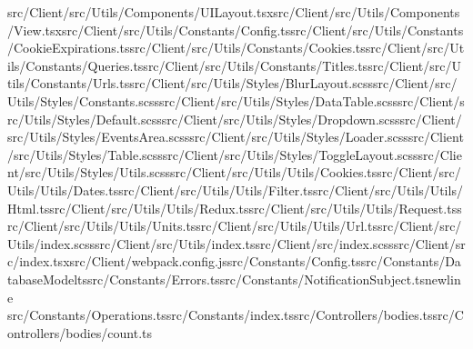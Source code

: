 \documentclass[a4paper,12pt]{article}
\begin{document}
src/Client/src/Utils/Components/UILayout.tsx\newline src/Client/src/Utils/Components/View.tsx\newline src/Client/src/Utils/Constants/Config.ts\newline src/Client/src/Utils/Constants/CookieExpirations.ts\newline src/Client/src/Utils/Constants/Cookies.ts\newline src/Client/src/Utils/Constants/Queries.ts\newline src/Client/src/Utils/Constants/Titles.ts\newline src/Client/src/Utils/Constants/Urls.ts\newline src/Client/src/Utils/Styles/BlurLayout.scss\newline src/Client/src/Utils/Styles/Constants.scss\newline src/Client/src/Utils/Styles/DataTable.scss\newline src/Client/src/Utils/Styles/Default.scss\newline src/Client/src/Utils/Styles/Dropdown.scss\newline src/Client/src/Utils/Styles/EventsArea.scss\newline src/Client/src/Utils/Styles/Loader.scss\newline src/Client/src/Utils/Styles/Table.scss\newline src/Client/src/Utils/Styles/ToggleLayout.scss\newline src/Client/src/Utils/Styles/Utils.scss\newline src/Client/src/Utils/Utils/Cookies.ts\newline src/Client/src/Utils/Utils/Dates.ts\newline src/Client/src/Utils/Utils/Filter.ts\newline src/Client/src/Utils/Utils/Html.ts\newline src/Client/src/Utils/Utils/Redux.ts\newline src/Client/src/Utils/Utils/Request.ts\newline src/Client/src/Utils/Utils/Units.ts\newline src/Client/src/Utils/Utils/Url.ts\newline src/Client/src/Utils/index.scss\newline src/Client/src/Utils/index.ts\newline src/Client/src/index.scss\newline src/Client/src/index.tsx\newline src/Client/webpack.config.js\newline src/Constants/Config.ts\newline src/Constants/DatabaseModelts\newline src/Constants/Errors.ts\newline src/Constants/NotificationSubject.tsnewline src/Constants/Operations.ts\newline src/Constants/index.ts\newline src/Controllers/bodies.ts\newline src/Controllers/bodies/count.ts\newline 
\end{document}
